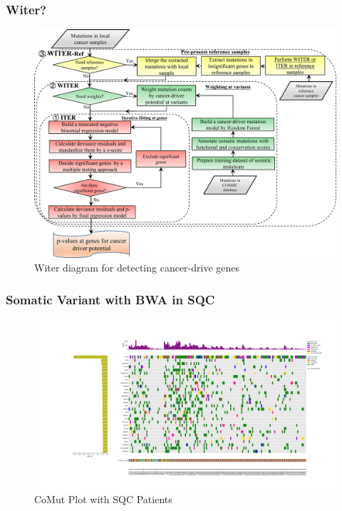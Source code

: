 \documentclass{beamer}
\begin{document}
    \begin{frame}
        \frametitle{Witer?}

        \begin{figure}
            \includegraphics[width=0.6 \linewidth]{figures/Workflow/witer.jpg}
            \caption{Witer diagram for detecting cancer-drive genes \protect\cite{witer1}}
        \end{figure}
    \end{frame}

    \begin{frame}
        \frametitle{Somatic Variant with BWA in SQC}

        \begin{figure}
            \includegraphics[width=\linewidth]{figures/Mutect2/BWA-SQC.pdf}
            \caption{CoMut Plot with SQC Patients}
        \end{figure}
    \end{frame}
\end{document}
